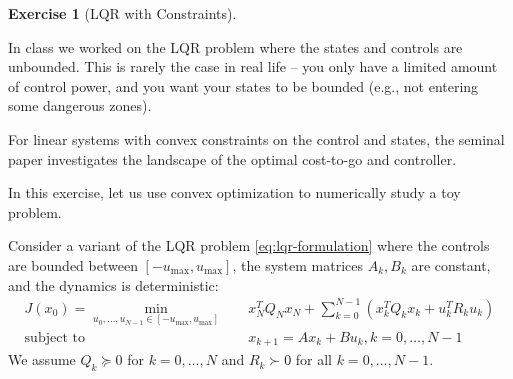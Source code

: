 \documentclass[
]{book}
\theoremstyle{definition}
\theoremstyle{definition}
\theoremstyle{definition}
\newtheorem{exercise}{Exercise}[chapter]
\theoremstyle{definition}
\theoremstyle{remark}
\begin{document}
\begin{exercise}[LQR with Constraints]
\protect\hypertarget{exr:lqrconstraints}{}\label{exr:lqrconstraints}

In class we worked on the LQR problem where the states and controls are unbounded. This is rarely the case in real life -- you only have a limited amount of control power, and you want your states to be bounded (e.g., not entering some dangerous zones).

For linear systems with convex constraints on the control and states, the seminal paper \citep{bemporad02automatica-explicit} investigates the landscape of the optimal cost-to-go and controller.

In this exercise, let us use convex optimization to numerically study a toy problem.

Consider a variant of the LQR problem \eqref{eq:lqr-formulation} where the controls are bounded between \([-u_{\max}, u_{\max}]\), the system matrices \(A_k, B_k\) are constant, and the dynamics is deterministic:
\begin{equation}
\begin{split}
J(x_0) = \min_{u_{0},\dots,u_{N-1} \in [-u_{\max},u_{\max}]} &\quad  x_N^T Q_N x_N + \sum_{k=0}^{N-1} (x_k^T Q_k x_k + u_k^T R_k u_k) \\
\text{subject to} &\quad  x_{k+1} = A x_k + B u_k,  k=0,\dots,N-1
\end{split}
\label{eq:lqr-constraints}
\end{equation}
We assume \(Q_k\succeq 0\) for \(k=0,\dots,N\) and \(R_k \succ 0\) for all \(k=0,\dots,N-1\).


\end{exercise}
\end{document}
